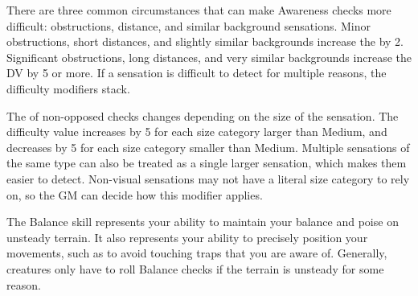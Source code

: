     There are three common circumstances that can make Awareness checks more difficult: obstructions, distance, and similar background sensations.
    Minor obstructions, short distances, and slightly similar backgrounds increase the  by 2.
    Significant obstructions, long distances, and very similar backgrounds increase the DV by 5 or more.
    If a sensation is difficult to detect for multiple reasons, the difficulty modifiers stack.

    The  of non-opposed checks changes depending on the size of the sensation.
    The difficulty value increases by 5 for each size category larger than Medium, and decreases by 5 for each size category smaller than Medium.
    Multiple sensations of the same type can also be treated as a single larger sensation, which makes them easier to detect.
    Non-visual sensations may not have a literal size category to rely on, so the GM can decide how this modifier applies.

\newpage
{}
  The Balance skill represents your ability to maintain your balance and poise on unsteady terrain.
  It also represents your ability to precisely position your movements, such as to avoid touching traps that you are aware of.
  Generally, creatures only have to roll Balance checks if the terrain is unsteady for some reason.

